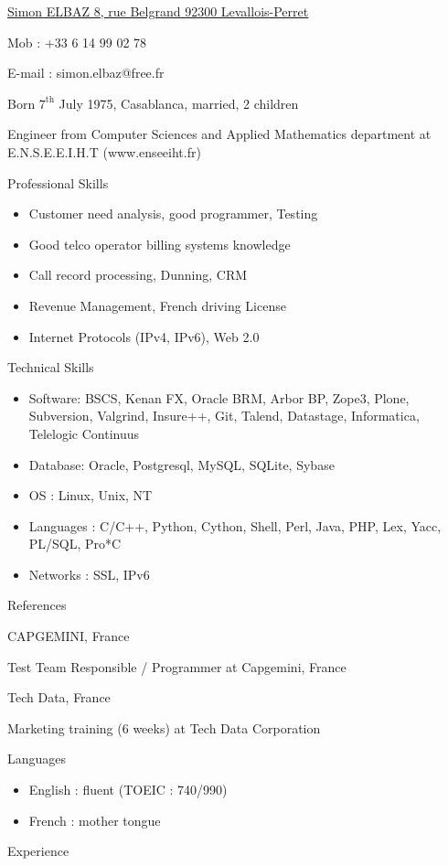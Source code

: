 \documentclass[a4paper,11pt]{letter}
\date{31 July 2008}
\begin{document}
\underline{Simon ELBAZ                8, rue Belgrand            92300 Levallois-Perret}


Mob :    +33 6 14 99 02 78

E-mail : simon.elbaz@free.fr

Born $7^\mathrm{th}$ July 1975, Casablanca, married, 2 children

Engineer from Computer Sciences and Applied Mathematics department at E.N.S.E.E.I.H.T (www.enseeiht.fr)

Professional Skills
\begin{itemize}
\item    Customer need analysis, good programmer, Testing
\item    Good telco operator billing systems knowledge 
\item    Call record processing, Dunning, CRM
\item    Revenue Management, French driving License
\item    Internet Protocols (IPv4, IPv6), Web 2.0
\end{itemize}

Technical Skills
\begin{itemize}
\item    Software: BSCS, Kenan FX, Oracle BRM, Arbor BP, Zope3, Plone, Subversion, Valgrind, Insure++, Git, Talend, Datastage, Informatica, Telelogic Continuus
\item    Database: Oracle, Postgresql, MySQL, SQLite, Sybase
\item    OS : Linux, Unix, NT
\item    Languages : C/C++, Python, Cython, Shell, Perl, Java, PHP, Lex, Yacc, PL/SQL, Pro*C
\item    Networks : SSL, IPv6
\end{itemize}

References

CAPGEMINI, France
	

Test Team Responsible / Programmer at Capgemini, France
	

Tech Data, France
	

Marketing training (6 weeks) at Tech Data Corporation

Languages
\begin{itemize}
\item    English : fluent (TOEIC : 740/990)
\item    French : mother tongue
\end{itemize}

Experience
\end{document}
